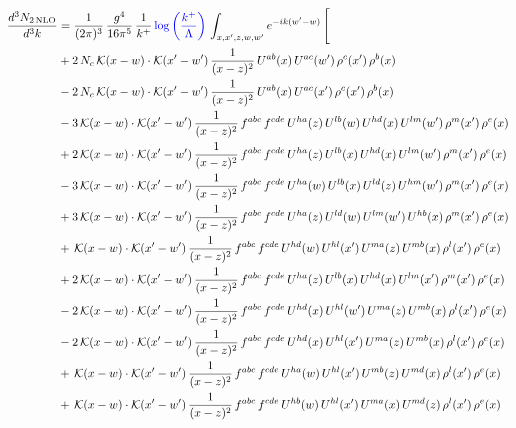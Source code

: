 \documentclass[9pt]{article}
\numberwithin{equation}{section}
\begin{document}
\begin{align}
\frac{d^{3}N_{2\,\mathrm{NLO}}}{d^{3}k} & = \frac{1}{(2\pi)^{3}}\,\frac{g^{4}}{16\pi^{5}}\,\frac{1}{k^{+}}\,{\color{blue}\log{\left(\frac{k^{+}}{\Lambda}\right)}}\,\int_{x,x',z,w,w'}e^{-ik(w'-w)}\,\Bigg[
\notag\\ &+2\,N_{c}\,\mathcal{K}(x-w)\cdot\mathcal{K}(x'-w')\,\frac{1}{(x-z)^{2}}\,U^{ab}(x)\,U^{ac}(w')\,\rho^{c}(x')\,\rho^{b}(x)\notag\\
&-2\,N_{c}\,\mathcal{K}(x-w)\cdot\mathcal{K}(x'-w')\,\frac{1}{(x-z)^{2}}\,U^{ab}(x)\,U^{ac}(x')\,\rho^{c}(x')\,\rho^{b}(x)\notag\\
&-3\,\mathcal{K}(x-w)\cdot\mathcal{K}(x'-w')\,\frac{1}{(x-z)^{2}}\,f^{abc}\,f^{cde}\,U^{ha}(z)\,U^{lb}(w)\,U^{hd}(x)\,U^{lm}(w')\,\rho^{m}(x')\,\rho^{e}(x)\notag\\
&+2\,\mathcal{K}(x-w)\cdot\mathcal{K}(x'-w')\,\frac{1}{(x-z)^{2}}\,f^{abc}\,f^{cde}\,U^{ha}(z)\,U^{lb}(x)\,U^{hd}(x)\,U^{lm}(w')\,\rho^{m}(x')\,\rho^{e}(x)\notag\\
&-3\,\mathcal{K}(x-w)\cdot\mathcal{K}(x'-w')\,\frac{1}{(x-z)^{2}}\,f^{abc}\,f^{cde}\,U^{ha}(w)\,U^{lb}(x)\,U^{ld}(z)\,U^{hm}(w')\,\rho^{m}(x')\,\rho^{e}(x)\notag\\
&+3\,\mathcal{K}(x-w)\cdot\mathcal{K}(x'-w')\,\frac{1}{(x-z)^{2}}\,f^{abc}\,f^{cde}\,U^{ha}(z)\,U^{ld}(w)\,U^{lm}(w')\,U^{hb}(x)\,\rho^{m}(x')\,\rho^{e}(x)\notag\\
&+\,\mathcal{K}(x-w)\cdot\mathcal{K}(x'-w')\,\frac{1}{(x-z)^{2}}\,f^{abc}\,f^{cde}\,U^{hd}(w)\,U^{hl}(x')\,U^{ma}(z)\,U^{mb}(x)\,\rho^{l}(x')\,\rho^{e}(x)\notag\\
&+2\,\mathcal{K}(x-w)\cdot\mathcal{K}(x'-w')\,\frac{1}{(x-z)^{2}}\,f^{abc}\,f^{cde}\,U^{ha}(z)\,U^{lb}(x)\,U^{hd}(x)\,U^{lm}(x')\,\rho^{m}(x')\,\rho^{e}(x)\notag\\
&-2\,\mathcal{K}(x-w)\cdot\mathcal{K}(x'-w')\,\frac{1}{(x-z)^{2}}\,f^{abc}\,f^{cde}\,U^{hd}(x)\,U^{hl}(w')\,U^{ma}(z)\,U^{mb}(x)\,\rho^{l}(x')\,\rho^{e}(x)\notag\\
&-2\,\mathcal{K}(x-w)\cdot\mathcal{K}(x'-w')\,\frac{1}{(x-z)^{2}}\,f^{abc}\,f^{cde}\,U^{hd}(x)\,U^{hl}(x')\,U^{ma}(z)\,U^{mb}(x)\,\rho^{l}(x')\,\rho^{e}(x)\notag\\
&+\,\mathcal{K}(x-w)\cdot\mathcal{K}(x'-w')\,\frac{1}{(x-z)^{2}}\,f^{abc}\,f^{cde}\,U^{ha}(w)\,U^{hl}(x')\,U^{mb}(z)\,U^{md}(x)\,\rho^{l}(x')\,\rho^{e}(x)\notag\\
&+\,\mathcal{K}(x-w)\cdot\mathcal{K}(x'-w')\,\frac{1}{(x-z)^{2}}\,f^{abc}\,f^{cde}\,U^{hb}(w)\,U^{hl}(x')\,U^{ma}(x)\,U^{md}(z)\,\rho^{l}(x')\,\rho^{e}(x)\notag\\

\end{align}
\end{document}
